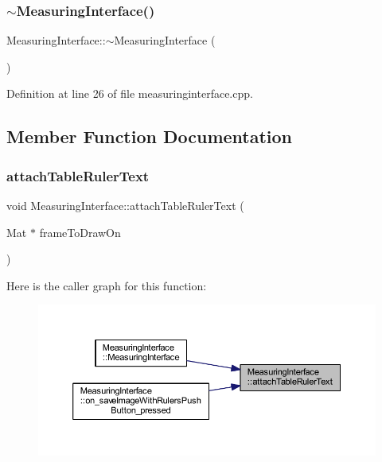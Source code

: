 \subsubsection{\texorpdfstring{$\sim$MeasuringInterface()}{~MeasuringInterface()}}
{\footnotesize\ttfamily Measuring\+Interface\+::$\sim$\+Measuring\+Interface (\begin{DoxyParamCaption}{ }\end{DoxyParamCaption})}



Definition at line 26 of file measuringinterface.\+cpp.



\subsection{Member Function Documentation}
\mbox{\label{class_measuring_interface_a7a0020d816d48433a2f5035d72b47c68}} 
\subsubsection{\texorpdfstring{attachTableRulerText}{attachTableRulerText}}
{\footnotesize\ttfamily void Measuring\+Interface\+::attach\+Table\+Ruler\+Text (\begin{DoxyParamCaption}\item[{Mat $\ast$}]{frame\+To\+Draw\+On }\end{DoxyParamCaption})\hspace{0.3cm}{\ttfamily [signal]}}

Here is the caller graph for this function\+:
\nopagebreak
\begin{figure}[H]
\begin{center}
\leavevmode
\includegraphics[width=350pt]{class_measuring_interface_a7a0020d816d48433a2f5035d72b47c68_icgraph}
\end{center}
\end{figure}
\mbox{\label{class_measuring_interface_a62ef5d03298c79e95511272a0c113ab8}} 
